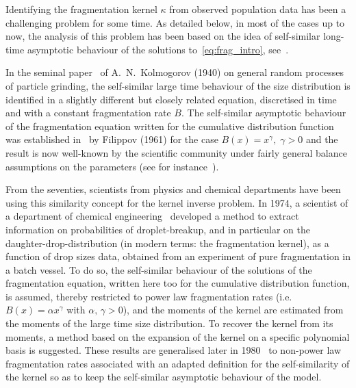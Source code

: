 \documentclass[AHL,Unicode,longabstracts,published]{cedram}
\begin{document}
Identifying the fragmentation kernel $\kappa$ from observed population data has been a challenging problem for some time. As detailed below, in most of the cases up to now, the analysis of this problem has been based on the idea of self-similar long-time asymptotic behaviour of the solutions to~\eqref{eq:frag_intro}, see~\cite{BCG13,Bertoin1,BW,CCGU,DubovskiStewart}.

In the seminal paper~\cite{Kolmogorov40} of A.~N.~Kolmogorov (1940) on general random processes of particle grinding, the self-similar large time behaviour of the size distribution is identified in a slightly different but closely related equation, discretised in time and with a constant fragmentation rate $B$. The self-similar asymptotic behaviour of the fragmentation equation written for the cumulative distribution function was established in~\cite{Filippov61} by Filippov (1961) for the case $B(x)=x^{\gamma},\;\gamma>0$ and the result is now well-known by the scientific community under fairly general balance assumptions on the parameters (see for instance~\cite{BCG13,CCM,EMR05,PerthameRyzhik}).


From the seventies, scientists from physics and chemical departments have been using this similarity concept for the kernel inverse problem. In 1974, a scientist of a department of chemical engineering~\cite{Ram74} developed a method to extract information on probabilities of droplet-breakup, and in particular on the daughter-drop-distribution (in modern terms: the fragmentation kernel), as a function of drop sizes data, obtained from an experiment of pure fragmentation in a batch vessel. To do so, the self-similar behaviour of the solutions of the fragmentation equation, written here too for the cumulative distribution function, is assumed, thereby restricted to power law fragmentation rates (i.e. $B(x)=\alpha x^\gamma$ with $\alpha,\,\gamma>0$), and the moments of the kernel are estimated from the moments of the large time size distribution. To recover the kernel from its moments, a method based on the expansion of the kernel on a specific polynomial basis is suggested. These results are generalised later in 1980~\cite{NRamG80} to non-power law fragmentation rates associated with an adapted definition for the self-similarity of the kernel so as to keep the self-similar asymptotic behaviour of the model.
\end{document}
